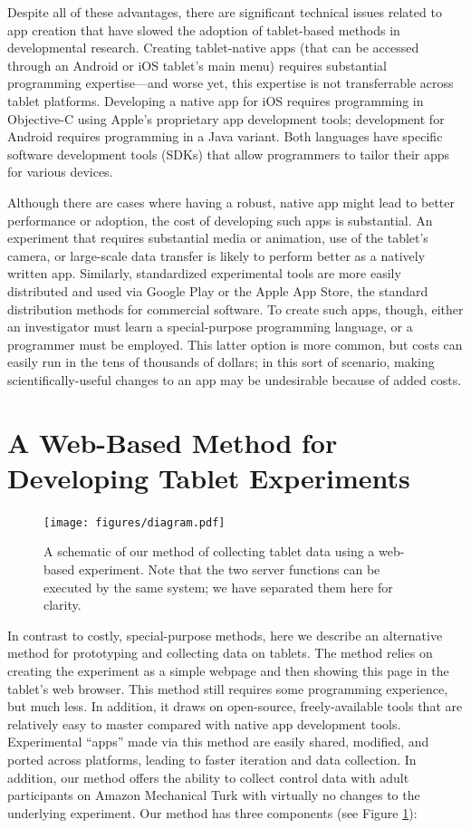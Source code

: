 \documentclass[man,noapacite]{apa2}
\begin{document}
Despite all of these advantages, there are significant technical issues related to app creation that have slowed the adoption of tablet-based methods in developmental research. Creating tablet-native apps (that can be accessed through an Android or iOS tablet's main menu) requires substantial programming expertise---and worse yet, this expertise is not transferrable across tablet platforms. Developing a native app for iOS requires programming in Objective-C using Apple's proprietary app development tools; development for Android requires programming in a Java variant. Both languages have specific software development tools (SDKs) that allow programmers to tailor their apps for various devices. 

Although there are cases where having a robust, native app might lead to better performance or adoption, the cost of developing such apps is substantial. An experiment that requires substantial media or animation, use of the tablet's camera, or large-scale data transfer is likely to perform better as a natively written app. Similarly, standardized experimental tools are more easily distributed and used via Google Play or the Apple App Store, the standard distribution methods for commercial software. To create such apps, though, either an investigator must learn a special-purpose programming language, or a programmer must be employed. This latter option is more common, but costs can easily run in the tens of thousands of dollars; in this sort of scenario, making scientifically-useful changes to an app may be undesirable because of added costs. 

\section{A Web-Based Method for Developing Tablet Experiments}


\begin{figure}[t] 
  \begin{center} 
    \texttt{[image: figures/diagram.pdf]} 
    \caption{\label{fig:diagram} A schematic of our method of collecting tablet data using a web-based experiment. Note that the two server functions can be executed by the same system; we have separated them here for clarity.}
  \end{center} 
\end{figure}

In contrast to costly, special-purpose methods, here we describe an alternative method for prototyping and collecting data on tablets. The method relies on creating the experiment as a simple webpage and then showing this page in the tablet's web browser. This method still requires some programming experience, but much less. In addition, it draws on open-source, freely-available tools that are relatively easy to master compared with native app development tools. Experimental ``apps'' made via this method are easily shared, modified, and ported across platforms, leading to faster iteration and data collection. In addition, our method offers the ability to collect control data with adult participants on Amazon Mechanical Turk \cite{paolacci2010,crump2013} with virtually no changes to the underlying experiment. Our method has three components (see Figure \ref{fig:diagram}):
\end{document}
